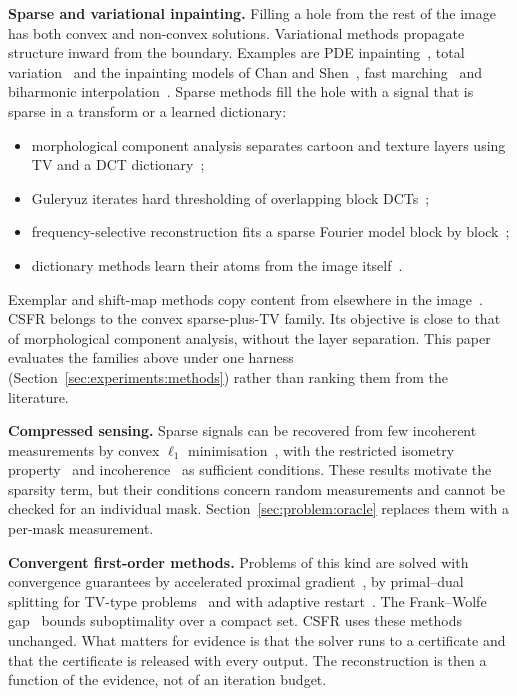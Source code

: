 \documentclass[final,3p]{elsarticle}
\begin{document}
\textbf{Sparse and variational inpainting.} Filling a hole from the rest of the image has both convex and non-convex solutions. Variational methods propagate structure inward from the boundary. Examples are PDE inpainting~\cite{bertalmio2000image}, total variation~\cite{rudin1992nonlinear} and the inpainting models of Chan and Shen~\cite{chan2002mathematical}, fast marching~\cite{telea2004image} and biharmonic interpolation~\cite{damelin2018surface}. Sparse methods fill the hole with a signal that is sparse in a transform or a learned dictionary:
\begin{itemize}
  \item morphological component analysis separates cartoon and texture layers using TV and a DCT dictionary~\cite{elad2005simultaneous};
  \item Guleryuz iterates hard thresholding of overlapping block DCTs~\cite{guleryuz2006nonlinear};
  \item frequency-selective reconstruction fits a sparse Fourier model block by block~\cite{seiler2015resampling};
  \item dictionary methods learn their atoms from the image itself~\cite{elad2006image,mairal2009online,aharon2006ksvd}.
\end{itemize}
Exemplar and shift-map methods copy content from elsewhere in the image~\cite{criminisi2004region,pritch2009shift}. CSFR belongs to the convex sparse-plus-TV family. Its objective is close to that of morphological component analysis, without the layer separation. This paper evaluates the families above under one harness (Section~\ref{sec:experiments:methods}) rather than ranking them from the literature.

\textbf{Compressed sensing.} Sparse signals can be recovered from few incoherent measurements by convex $\ell_{1}$ minimisation~\cite{candes2006robust,donoho2006compressed,candes2006stable}, with the restricted isometry property~\cite{candes2008restricted} and incoherence~\cite{candes2007sparsity} as sufficient conditions. These results motivate the sparsity term, but their conditions concern random measurements and cannot be checked for an individual mask. Section~\ref{sec:problem:oracle} replaces them with a per-mask measurement.

\textbf{Convergent first-order methods.} Problems of this kind are solved with convergence guarantees by accelerated proximal gradient~\cite{beck2009fast}, by primal--dual splitting for TV-type problems~\cite{chambolle2011first} and with adaptive restart~\cite{odonoghue2015adaptive}. The Frank--Wolfe gap~\cite{frank1956algorithm} bounds suboptimality over a compact set. CSFR uses these methods unchanged. What matters for evidence is that the solver runs to a certificate and that the certificate is released with every output. The reconstruction is then a function of the evidence, not of an iteration budget.
\end{document}
